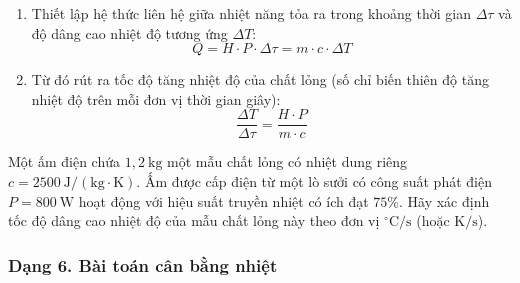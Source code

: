 \begin{phuongphap}
\begin{enumerate}
\item Thiết lập hệ thức liên hệ giữa nhiệt năng tỏa ra trong khoảng thời gian $\Delta \tau$ và độ dâng cao nhiệt độ tương ứng $\Delta T$:
\[
Q = H \cdot P \cdot \Delta \tau = m \cdot c \cdot \Delta T
\]
\item Từ đó rút ra tốc độ tăng nhiệt độ của chất lỏng (số chỉ biến thiên độ tăng nhiệt độ trên mỗi đơn vị thời gian giây):
\[
\dfrac{\Delta T}{\Delta \tau} = \dfrac{H \cdot P}{m \cdot c}
\]
\end{enumerate}
\end{phuongphap}
\begin{vidumau}
Một ấm điện chứa $1{,}2\ \mathrm{kg}$ một mẫu chất lỏng có nhiệt dung riêng $c = 2500\ \mathrm{J/(kg\cdot K)}$. Ấm được cấp điện từ một lò sưởi có công suất phát điện $P = 800\ \mathrm{W}$ hoạt động với hiệu suất truyền nhiệt có ích đạt $75\%$. Hãy xác định tốc độ dâng cao nhiệt độ của mẫu chất lỏng này theo đơn vị $^\circ\mathrm{C/s}$ (hoặc $\mathrm{K/s}$).
\end{vidumau}

\subsubsection{Dạng 6. Bài toán cân bằng nhiệt}


